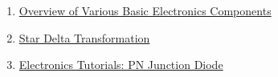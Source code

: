 \begin{enumerate}

\item \href{https://www.elprocus.com/major-electronic-components/}{Overview of Various Basic Electronics Components}

\item \href{https://www.electronics-tutorials.ws/dccircuits/dcp_10.html}{Star Delta Transformation}

\item \href{https://www.electronics-tutorials.ws/diode/diode_3.html}{Electronics Tutorials: PN Junction Diode}

\end{enumerate}


